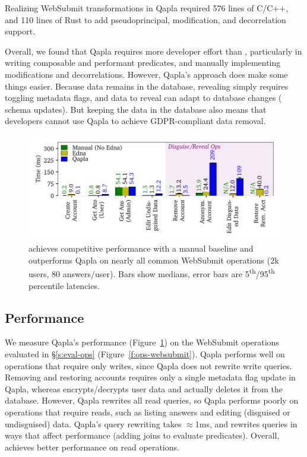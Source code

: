 %
Realizing WebSubmit transformations in Qapla required 576 lines of C/C++, and
110 lines of Rust to add pseudoprincipal, modification, and decorrelation
support.
%

Overall, we found that Qapla requires more developer effort than \sys, particularly in writing
composable and performant predicates, and manually implementing modifications
and decorrelations. However, Qapla's approach does make some things easier.
%
Because data remains in the database, revealing simply requires toggling
metadata flags, and data to reveal can adapt to database changes (\eg
schema updates). But keeping the data in the database also means that developers cannot use Qapla to
achieve GDPR-compliant data removal. %

%
\begin{figure}[t]
  \centering
      \includegraphics[width=\columnwidth]{figs/websubmit_qapla_op_stats}
    \caption[Latencies of WebSubmit operations when implemented with
    Qapla vs. with \sys.]{\sys achieves competitive performance with a manual baseline and
    outperforms Qapla on nearly all common WebSubmit operations (2k users,
    80 answers/user).
    Bars show medians, error bars are 5\textsuperscript{th}/95\textsuperscript{th}
    percentile latencies.}
  \label{f:qapla_ws_opstats}
\end{figure}

%
\subsection{Performance}
\label{s:eval-qapla-perf}
%
We measure Qapla's performance (Figure~\ref{f:qapla_ws_opstats}) on the 
WebSubmit operations evaluated in \S\ref{s:eval-ops} (Figure~\ref{f:ops-websubmit}).
%
Qapla performs well on operations that require only writes, since Qapla does not
rewrite write queries.  Removing and restoring accounts requires only a single
metadata flag update in Qapla, whereas \sys encrypts/decrypts user data and
actually deletes it from the database.
%
However, Qapla rewrites all read queries, so Qapla performs poorly on operations
that require reads, such as listing answers and editing (disguised or
undisguised) data.
%
Qapla's query rewriting takes $\approx$1ms, and rewrites  queries in
ways that affect performance (\eg adding joins to evaluate predicates).
%
Overall, \sys achieves better performance on read operations.

%
